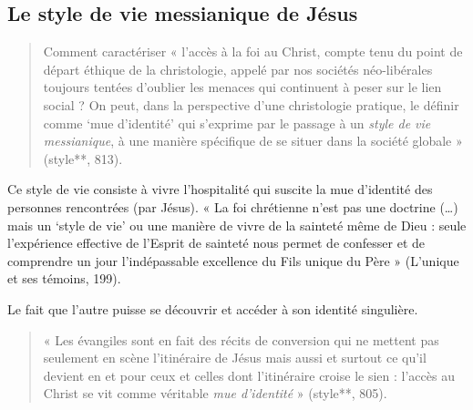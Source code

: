 \subsection{Le style de vie messianique de Jésus}


\begin{quote}
    Comment caractériser « l’accès à la foi au Christ, compte tenu du point de départ éthique de la christologie, appelé par nos sociétés néo-libérales toujours tentées d’oublier les menaces qui continuent à peser sur le lien social ? On peut, dans la perspective d’une christologie pratique, le définir comme ‘mue d’identité’ qui s’exprime par le passage à un\textit{ style de vie messianique}, à une manière spécifique de se situer dans la société globale » (style**, 813).
\end{quote}

\begin{Def}
Ce style de vie consiste à vivre l’hospitalité qui suscite la mue
d’identité des personnes rencontrées (par Jésus). « La foi chrétienne n’est pas une doctrine
(…) mais un ‘style de vie’ ou une manière de vivre de la sainteté même de Dieu : seule
l’expérience effective de l’Esprit de sainteté nous permet de confesser et de comprendre un
jour l’indépassable excellence du Fils unique du Père » (L’unique et ses témoins, 199).
\end{Def}

\begin{Def}
Le fait que l’autre puisse se découvrir et accéder à son identité singulière.

\end{Def}

\begin{quote}
    « Les évangiles sont en fait des récits de conversion qui ne mettent pas seulement en scène l’itinéraire de Jésus mais aussi et surtout ce qu’il devient en et pour ceux et celles dont l’itinéraire croise le sien : l’accès au Christ se vit comme véritable \textit{mue d’identité} » (style**, 805). 
\end{quote}



